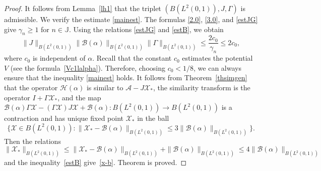 \documentclass[11pt,centertags,reqno,twoside]{amsart}
\numberwithin{equation}{section}
\theoremstyle{definition}
\theoremstyle{remark}
\begin{document}
\begin{proof}
It follows from Lemma~\ref{lh1} that the triplet $(B(L^2(0, 1)), J, \Gamma)$ is admissible.
We verify the estimate \eqref{mainest}. The formulas \eqref{2.0},
\eqref{3.0}, and \eqref{estJG} give $\gamma_n\geqslant 1$ for $n\in\mathbb{J}$.
Using the relations \eqref{estJG} and \eqref{estB}, we obtain
\[
\|J\|_{B(L^2(0, 1))}\|\mathcal{B}(\alpha)\|_{B(L^2(0, 1))}\|\Gamma\|_{B(L^2(0, 1))}
\leqslant \frac{2c_0}{\gamma_n}\leqslant 2c_0,
\]
where $c_0$ is independent of $\alpha$. Recall that the constant $c_0$ estimates
the potential $V$ (see the formula~\eqref{Vc1lalpha}). Therefore, choosing $c_0<1/8$,
we can always ensure that the inequality \eqref{mainest} holds.
It follows from Theorem~\ref{thsimgen} that the operator
$\mathcal{H}(\alpha)$ is similar to $\mathcal{A}-J\mathcal{X}_*$, the similarity
transform is the operator $I+\Gamma\mathcal{X}_*$, and the map
$\mathcal{B}(\alpha)\Gamma\mathcal{X}-(\Gamma\mathcal{X})J\mathcal{X}
+\mathcal{B}(\alpha): B(L^2(0, 1))\to B(L^2(0, 1))$ is a contraction and
has unique fixed point $\mathcal{X}_*$ in the ball
\[
\{\mathcal{X}\in B(L^2(0, 1)): \|\mathcal{X}_*-\mathcal{B}(\alpha)\|_{B(L^2(0, 1))}
\leqslant 3\|\mathcal{B}(\alpha)\|_{B(L^2(0, 1))}\}.
\]
Then the relations
\[
\|\mathcal{X}_*\|_{B(L^2(0, 1))}
\leqslant
\|\mathcal{X}_*-\mathcal{B}(\alpha)\|_{B(L^2(0, 1))}+\|\mathcal{B}(\alpha)\|_{B(L^2(0, 1))}
\leqslant 4\|\mathcal{B}(\alpha)\|_{B(L^2(0, 1))}
\]
and the inequality~\eqref{estB} give~\eqref{x-b}. Theorem is proved.
\end{proof}
\end{document}
